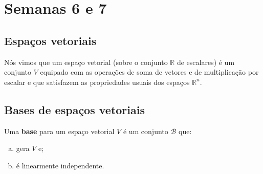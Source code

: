 

\providecommand{\dir}{..}


%

\chapter{Semanas 6 e 7}



\section{Espaços vetoriais}

Nós vimos que um espaço vetorial (sobre o conjunto $\mathbb{R}$ de escalares) é um conjunto $V$ equipado com as operações de soma de vetores e de multiplicação por escalar e que satisfazem as propriedades usuais dos espaços $\mathbb{R}^n$.



\section{Bases de espaços vetoriais}


Uma \textbf{base} para um espaço vetorial $V$ é um conjunto $\mathcal{B}$ que:
\begin{enumerate}[(a)]
	\item gera $V$ e;
	\item é linearmente independente.
\end{enumerate}


